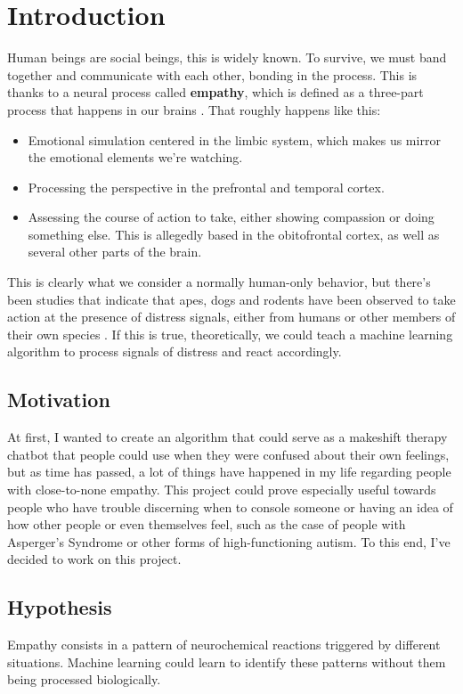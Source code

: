 \chapter{Introduction}
Human beings are social beings, this is widely known. To survive, we must band together and communicate with each other, bonding in the process. This is thanks to a neural process called \textbf{empathy}, which is defined as a three-part process that happens in our brains \citep{rf1}. That roughly happens like this:
\begin{itemize}
	\item Emotional simulation centered in the limbic system, which makes us mirror the emotional elements we're watching.
	\item Processing the perspective in the prefrontal and temporal cortex.
	\item Assessing the course of action to take, either showing compassion or doing something else. This is allegedly based in the obitofrontal cortex, as well as several other parts of the brain.
\end{itemize}
This is clearly what we consider a normally human-only behavior, but there's been studies that indicate that apes, dogs and rodents have been observed to take action at the presence of distress signals, either from humans or other members of their own species \citep{rf2}.
If this is true, theoretically, we could teach a machine learning algorithm to process signals of distress and react accordingly.

\section{Motivation}
At first, I wanted to create an algorithm that could serve as a makeshift therapy chatbot that people could use when they were confused about their own feelings, but as time has passed, a lot of things have happened in my life regarding people with close-to-none empathy.
This project could prove especially useful towards people who have trouble discerning when to console someone or having an idea of how other people or even themselves feel, such as the case of people with Asperger's Syndrome or other forms of high-functioning autism.
To this end, I've decided to work on this project.

\section{Hypothesis}
Empathy consists in a pattern of neurochemical reactions triggered by different situations. Machine learning could learn to identify these patterns without them being processed biologically.

